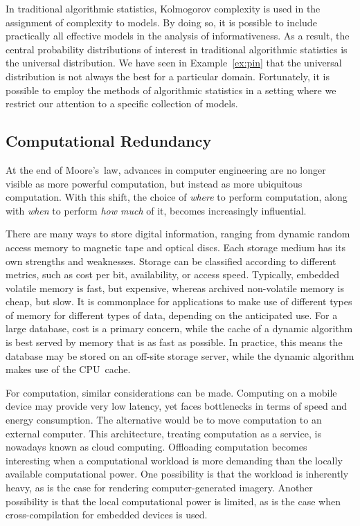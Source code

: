 In traditional algorithmic statistics, Kolmogorov complexity is used in the assignment of complexity to models.
By doing so, it is possible to include practically all effective models in the analysis of informativeness.
As a result, the central probability distributions of interest in traditional algorithmic statistics is the universal distribution.
We have seen in Example~\ref{ex:pin} that the universal distribution is not always the best for a particular domain.
Fortunately, it is possible to employ the methods of algorithmic statistics in a setting where we restrict our attention to a specific collection of models.

\subsection{Computational Redundancy}
At the end of Moore's~law, advances in computer engineering are no longer visible as more powerful computation, but instead as more ubiquitous computation.
With this shift, the choice of \emph{where} to perform computation, along with \emph{when} to perform \emph{how much} of it, becomes increasingly influential.

\begin{example}
  There are many ways to store digital information, ranging from dynamic random access memory to magnetic tape and optical discs.
  Each storage medium has its own strengths and weaknesses.
  Storage can be classified according to different metrics, such as cost per bit, availability, or access speed.
  Typically, embedded volatile memory is fast, but expensive, whereas archived non-volatile memory is cheap, but slow.
  It is commonplace for applications to make use of different types of memory for different types of data, depending on the anticipated use.
  For a large database, cost is a primary concern, while the cache of a dynamic algorithm is best served by memory that is as fast as possible.
  In practice, this means the database may be stored on an off-site storage server, while the dynamic algorithm makes use of the CPU~cache.

  For computation, similar considerations can be made.
  Computing on a mobile device may provide very low latency, yet faces bottlenecks in terms of speed and energy consumption.
  The alternative would be to move computation to an external computer.
  This architecture, treating computation as a service, is nowadays known as cloud computing.
  Offloading computation becomes interesting when a computational workload is more demanding than the locally available computational power.
  One possibility is that the workload is inherently heavy, as is the case for rendering computer-generated imagery.
  Another possibility is that the local computational power is limited, as is the case when cross-compilation for embedded devices is used.
\end{example}

